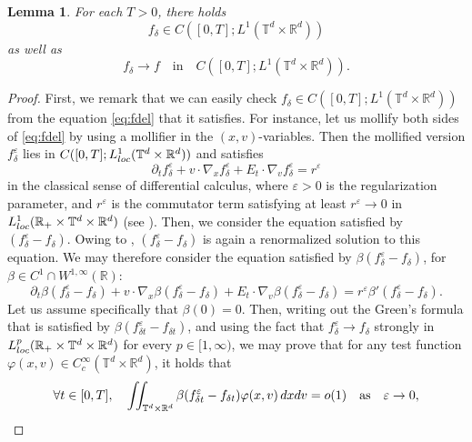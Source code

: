\documentclass[11pt,reqno,a4paper]{amsart}
\newcommand{\R}{\mathbb{R}}
\newcommand{\ve}{\varepsilon}
\newcommand{\p}{\partial}
\newcommand{\iinttr}{\iint_{\T^d\times\R^d}}
\newtheorem{lemma}{Lemma}[section]
\theoremstyle{definition}
\theoremstyle{remark}
\numberwithin{equation}{section}
\newcommand{\T} {\mathbb T}
\newcommand{\dx}{\textnormal{d}x}
\newcommand{\dv}{\textnormal{d}v}
\begin{document}
\begin{lemma}\label{lem:carbonara}
    For each $T>0$, there holds
    \begin{equation*}
        f_\delta \in C([0,T];L^1(\T^d\times\R^d))
    \end{equation*}
    as well as
    \begin{equation*}
        f_{\delta} \to f \quad \text{in} \quad C([0,T];L^1(\T^d\times\R^d)).
    \end{equation*}
\end{lemma}
\begin{proof}
    First, we remark that we can easily check $f_\delta\in C([0,T];L^1(\T^d\times\R^d))$ from the equation \eqref{eq:fdel} that it satisfies. For instance, let us mollify both sides of \eqref{eq:fdel} by using a mollifier in the $(x,v)$-variables. Then the mollified version $f_\delta^\ve$ lies in $C([0,T];L^1_{\rm loc}(\T^d\times\R^d))$ and satisfies
    \begin{equation*}
        \p_t f_\delta^\ve + v\cdot \nabla_x f_\delta^\ve + E_t\cdot \nabla_v f_\delta^\ve = r^\ve
    \end{equation*}
    in the classical sense of differential calculus, where $\ve>0$ is the regularization parameter, and $r^\ve$ is the commutator term satisfying at least $r^\ve\to 0$ in $L^1_{\rm loc}(\R_+\times \T^d\times\R^d)$ (see \cite{dipernalions1989b}). Then, we consider the equation satisfied by $(f_\delta^\ve - f_\delta)$. Owing to \cite{dipernalions1989b}, $(f_\delta^\ve - f_\delta)$ is again a renormalized solution to this equation. We may therefore consider the equation satisfied by $\beta(f_\delta^\ve - f_\delta)$, for $\beta\in C^1\cap W^{1,\infty}(\R)$:
    \begin{equation*}
        \p_t \beta(f_\delta^\ve - f_\delta) + v\cdot \nabla_x \beta(f_\delta^\ve - f_\delta) + E_t \cdot \nabla_v \beta(f_\delta^\ve - f_\delta) = r^\ve \beta'(f_\delta^\ve - f_\delta).
    \end{equation*}
    Let us assume specifically that $\beta(0)=0$. Then, writing out the Green's formula that is satisfied by $\beta(f_{\delta t}^\ve - f_{\delta t})$, and using the fact that $f_\delta^\ve\to f_\delta$ strongly in $L^p_{\rm loc}(\R_+\times\T^d\times\R^d)$ for every $p\in [1,\infty)$, we may prove that for any test function $\varphi(x,v)\in C_c^\infty(\T^d\times\R^d)$, it holds that
    \begin{equation*}
        \forall t\in [0,T], \quad \iinttr \beta(f_{\delta t}^\ve - f_{\delta t}) \varphi(x,v) \,\dx\dv = o(1) \quad \text{as} \quad \ve\to 0,

\end{equation*}
\end{proof}
\end{document}
